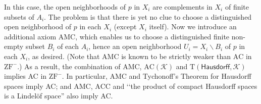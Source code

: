 \documentclass{article}
\begin{document}
\begin{itemize}
In this case, the open neighborhoods of $p$ in $X_i$ are complements in $X_i$ of finite subsets of $A_i$.
The problem is that there is yet no clue to choose a distinguished open neighborhood of $p$ in each $X_i$ (except $X_i$ itself).
Now we introduce an additional axiom $\mathrm{AMC}$, which enables us to choose a distinguished finite non-empty subset $B_i$ of each $A_i$, hence an open neighborhood $U_i = X_i \smallsetminus B_i$ of $p$ in each $X_i$, as desired.
(Note that $\mathrm{AMC}$ is known to be strictly weaker than $\mathrm{AC}$ in $\mathrm{ZF}^-$.)
As a result, the combination of $\mathrm{AMC}$, $\mathrm{AC}(\mathcal{K})$ and $\mathrm{T}(\mathsf{Hausdorff},\mathcal{K})$ implies AC in $\mathrm{ZF}^-$.
In particular, $\mathrm{AMC}$ and Tychonoff's Theorem for Hausdorff spaces imply AC; and $\mathrm{AMC}$, $\mathrm{ACC}$ and \lq\lq the product of compact Hausdorff spaces is a Lindel\"{o}f space'' also imply AC.
\end{itemize}
\end{document}
